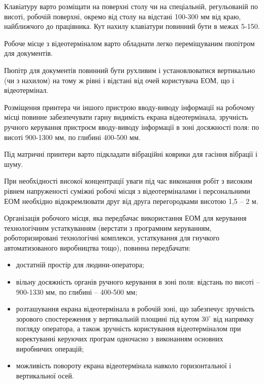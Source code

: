 \documentclass[simple,a4paper,14pt,ukrainian,utf8]{eskdtext}
\begin{document}
\begin{appendices}
                Клавіатуру варто розміщати на поверхні столу чи на спеціальній, регульованій по висоті, робочій поверхні, окремо від столу на відстані 100-300 мм від краю, найближчого до працівника. Кут нахилу клавіатури повинний бути в межах 5-150.

                Робоче місце з відеотерміналом варто обладнати легко переміщуваним пюпітром для документів.

                Пюпітр для документів повинний бути рухливим і установлюватися вертикально (чи з нахилом) на тому ж рівні і відстані від очей користувача ЕОМ, що і відеотермінал.

                Розміщення принтера чи іншого пристрою вводу-виводу інформації на робочому місці повинне забезпечувати гарну видимість екрана відеотермінала, зручність ручного керування пристроєм вводу-виводу інформації в зоні досяжності поля: по висоті 900-1300 мм, по глибині 400-500 мм.

                Під матричні принтери варто підкладати вібраційні коврики для гасіння вібрації і шуму.

                При необхідності високої концентрації уваги під час виконання робіт з високим рівнем напруженості суміжні робочі місця з відеотерміналами і персональними ЕОМ необхідно відокремлювати друг від друга перегородками висотою 1,5 -- 2 м.

                Організація робочого місця, яка передбачає використання ЕОМ для керування технологічним устаткуванням (верстати з програмним керуванням, роботоризировані технологічні комплекси, устаткування для гнучкого автоматизованого виробництва тощо), повинна передбачати:

                \begin{itemize}
                    \item достатній простір для людини-оператора;
                    \item вільну досяжність органів ручного керування в зоні поля: відстань по висоті -- 900-1330 мм, по глибині -- 400-500 мм;
                    \item розташування екрана відеотермінала в робочій зоні, що забезпечує зручність зорового спостереження у вертикальній площині під кутом $30^{\circ}$ від напрямку погляду оператора, а також зручність користування відеотерміналом при коректуванні керуючих програм одночасно з виконанням основних виробничих операцій;
                    \item можливість повороту екрана відеотермінала навколо горизонтальної і вертикальної осей.
                \end{itemize}


\end{appendices}
\end{document}
